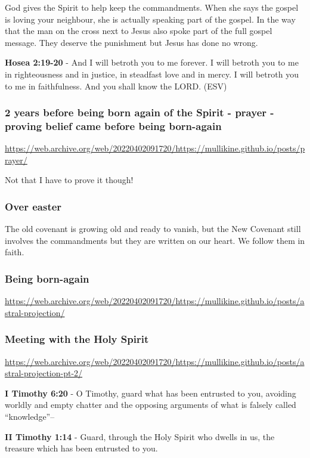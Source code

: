 \documentclass[11pt]{article}
\begin{document}
God gives the Spirit to help keep the commandments. When she says the gospel is loving your neighbour, she is actually speaking part of the gospel. In the way that the man on the cross next to Jesus also spoke part of the full gospel message. They deserve the punishment but Jesus has done no wrong.

\textbf{Hosea 2:19-20} - And I will betroth you to me forever. I will betroth you to me in righteousness and in justice, in steadfast love and in mercy. I will betroth you to me in faithfulness. And you shall know the LORD. (ESV)

\subsubsection{2 years before being born again of the Spirit - prayer - proving belief came before being born-again}
\label{sec:org9179f1c}
\url{https://web.archive.org/web/20220402091720/https://mullikine.github.io/posts/prayer/}

Not that I have to prove it though!

\subsubsection{Over easter}
\label{sec:org731055b}
The old covenant is growing old and ready to vanish, but the New Covenant still involves the commandments but they are written on our heart.
We follow them in faith.

\subsubsection{Being born-again}
\label{sec:org8737f88}
\url{https://web.archive.org/web/20220402091720/https://mullikine.github.io/posts/astral-projection/}

\subsubsection{Meeting with the Holy Spirit}
\label{sec:org37dace9}
\url{https://web.archive.org/web/20220402091720/https://mullikine.github.io/posts/astral-projection-pt-2/}

\textbf{I Timothy 6:20} - O Timothy, guard what has been entrusted to you, avoiding worldly and empty chatter and the opposing arguments of what is falsely called “knowledge”--

\textbf{II Timothy 1:14} - Guard, through the Holy Spirit who dwells in us, the treasure which has been entrusted to you.
\end{document}
